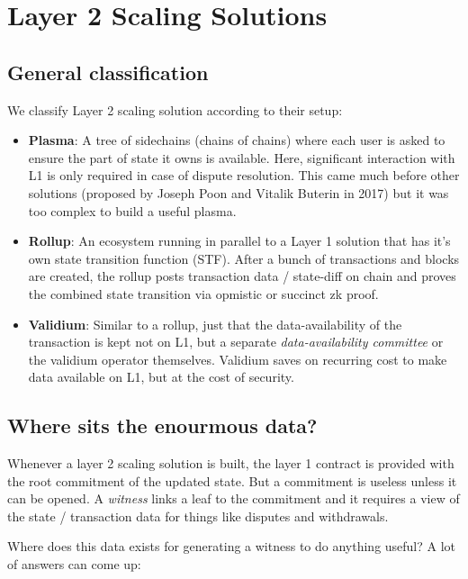 
\chapter{Layer 2 Scaling Solutions}

\section{General classification}
We classify Layer 2 scaling solution according to their setup:
\begin{itemize}
    \item \textbf{Plasma}: A tree of sidechains (chains of chains) where each user is asked to ensure the part of state it owns is available. Here, significant interaction with L1 is only required in case of dispute resolution. This came much before other solutions (proposed by Joseph Poon and Vitalik Buterin in 2017) but it was too complex to build a useful plasma.
    \item \textbf{Rollup}: An ecosystem running in parallel to a Layer 1 solution that has it's own state transition function (STF). After a bunch of transactions and blocks are created, the rollup posts transaction data / state-diff on chain and proves the combined state transition via opmistic or succinct zk proof.
    \item \textbf{Validium}: Similar to a rollup, just that the data-availability of the transaction is kept not on L1, but a separate \emph{data-availability committee} or the validium operator themselves. Validium saves on recurring cost to make data available on L1, but at the cost of security.
\end{itemize}

\section{Where sits the enourmous data?}
Whenever a layer 2 scaling solution is built, the layer 1 contract is provided with the root commitment of the updated state. But a commitment is useless unless it can be opened. A \emph{witness} links a leaf to the commitment and it requires a view of the state / transaction data for things like disputes and withdrawals.

Where does this data exists for generating a witness to do anything useful? A lot of answers can come up:

